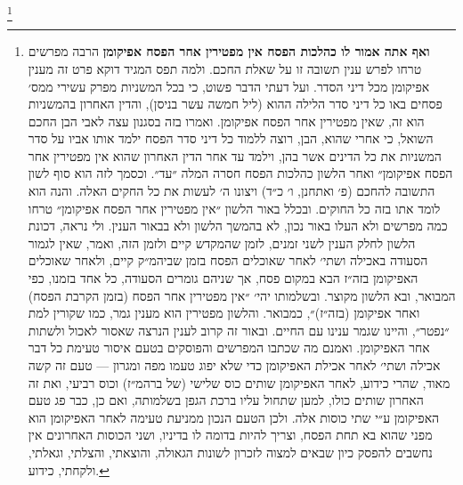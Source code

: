 \documentclass[12pt, openany]{book}
\newcommand{\footnotecomment}[1]{
	\renewcommand\thefootnote{}
	\footnote{\textsf{#1}}}
\newcommand{\commenta}[1]{\footnotecomment{#1}\hspace{0em}}
\begin{document}
\commenta{\textrm{\textbf{ואף אתה אמור לו כהלכות הפסח אין מפטירין אחר הפסח אפיקומן}} הרבה מפרשים טרחו לפרש ענין תשובה זו על שאלת החכם. ולמה תפס  המגיד דוקא פרט זה מענין אפיקומן מכל דיני הסדר. ועל דעתי הדבר פשוט, כי בכל המשניות מפרק עשירי ממס׳ פסחים באו כל דיני סדר הלילה ההוא (ליל חמשה עשר בניסן), והדין האחרון בהמשניות הוא זה, שאין מפטירין אחר הפסח אפיקומן. ואמרו בזה בסגנון עצה לאבי הבן החכם השואל, כי אחרי שהוא, הבן, רוצה ללמוד כל דיני סדר הפסח ילמד אותו אביו על סדר המשניות את כל הדינים אשר בהן, וילמד עד אחר הדין האחרון שהוא אין מפטירין אחר הפסח אפיקומן״ ואחר הלשון כהלכות הפסח חסרה המלה ״עד״. וכסמך לזה הוא סוף לשון התשובה להחכם (פ׳ ואתחנן, ו׳ כ״ד) ויצונו ה׳ לעשות את כל החקים האלה. והנה הוא לומד אתו בזה כל החוקים. ובכלל באור הלשון ״אין מפטירין אחר הפסח אפיקומן״ טרחו כמה מפרשים ולא העלו באור נכון, לא בהמשך הלשון ולא בבאור הענין. ולי נראה, דכונת הלשון לחלק הענין לשני זמנים, לזמן שהמקדש קיים ולזמן הזה, ואמר, שאין לגמור הסעודה באכילה ושתי׳ לאחר שאוכלים הפסח בזמן שביהמ״ק קיים, ולאחר שאוכלים האפיקומן בזה״ז הבא במקום פסח, אך שניהם גומרים הסעודה, כל אחד בזמנו, כפי המבואר, ובא הלשון מקוצר. ובשלמותו יהי׳ ״אין מפטירין אחר הפסח (בזמן הקרבת הפסח) ואחר אפיקומן (בזה״ז)״, כמבואר. והלשון מפטירין הוא מענין גמר, כמו שקורין למת ״נפטר״, והיינו שגמר ענינו עם החיים. ובאור זה קרוב לענין הנרצה שאסור לאכול ולשתות אחר האפיקומן. ואמנם מה שכתבו המפרשים והפוסקים בטעם איסור טעימת כל דבר אכילה ושתי׳ לאחר אכילת האפיקומן כדי שלא יפוג טעמו מפה ומגרון — טעם זה קשה מאוד, שהרי כידוע, לאחר האפיקומן שותים כוס שלישי (של ברהמ״ז) וכוס רביעי, ואת זה האחרון שותים כולו, למען שתחול עליו ברכת הגפן בשלמותה, ואם כן, כבר פג טעם האפיקומן ע״י שתי כוסות אלה. ולכן הטעם הנכון ממניעת טעימה לאחר האפיקומן הוא מפני שהוא בא תחת הפסח, וצריך להיות בדומה לו בדיניו, ושני הכוסות האחרונים אין נחשבים להפסק כיון שבאים למצוה לזכרון לשונות הגאולה, והוצאתי, והצלתי, וגאלתי, ולקחתי, כידוע.}%
\end{document}
